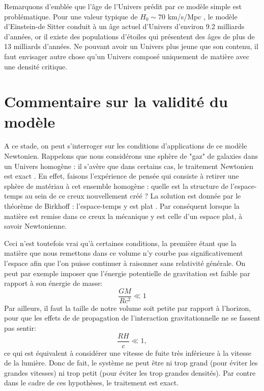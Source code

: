 Remarquons d'emblée que l'âge de l'Univers prédit par ce modèle simple est problématique. Pour une valeur typique de $H_0\sim 70$ km/s/Mpc , le modèle d'Einstein-de Sitter conduit à un âge actuel d'Univers d'environ 9.2 milliards d'années, or il existe des populations d'étoiles qui présentent des âges de plus de 13 milliards d'années. Ne pouvant avoir un Univers plus jeune que son contenu, il faut envisager autre chose qu'un Univers composé uniquement de matière avec une densité critique.

\section{Commentaire sur la validité du modèle}
A ce stade, on peut s'interroger sur les conditions d'applications de ce modèle Newtonien. Rappelons que nous considérons une sphère de "gaz" de galaxies dans un Univers homogène : il s'avère que dans certains cas, le traitement Newtonien est exact . En effet, faisons l'expérience de pensée qui consiste à retirer une sphère de matériau à cet ensemble homogène : quelle est la structure de l'espace-temps au sein de ce creux nouvellement créé ? La solution est donnée par le théorème de Birkhoff : l'espace-temps y est plat . Par conséquent lorsque la matière est remise dans ce creux la mécanique y est celle d'un espace plat, à savoir Newtonienne.

Ceci n'est toutefois vrai qu'à certaines conditions, la première étant que la matière que nous remettons dans ce volume n'y courbe pas significativement l'espace afin que l'on puisse continuer à raisonner sans relativité générale. On peut par exemple imposer que l'énergie potentielle de gravitation est faible par rapport à son énergie de masse:
\begin{equation}
\frac{GM}{Rc^2}\ll 1
\end{equation}
Par ailleurs, il faut la taille de notre volume soit petite par rapport à l'horizon, pour que les effets de de propagation de l'interaction gravitationnelle  ne se fassent pas sentir:
\begin{equation}
\frac{RH}{c}\ll 1,
\end{equation}
ce qui est équivalent à considérer une vitesse de fuite très inférieure à la vitesse de la lumière. Donc de fait, le système ne peut être ni trop grand (pour éviter les grandes vitesses) ni trop petit (pour éviter les trop grandes densités). Par contre dans le cadre de ces hypothèses, le traitement est exact.


